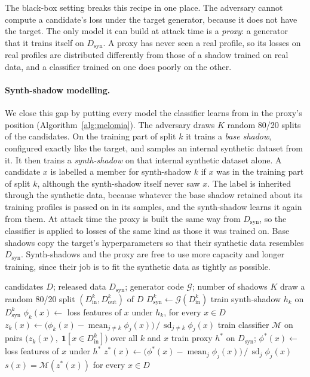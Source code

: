 \documentclass[webpdf,contemporary,large]{oup-authoring-template}
\newcommand{\Dsyn}{D_{\mathrm{syn}}}
\newcommand{\melo}{\textsc{MeLoMIA}}
\begin{document}
The black-box setting breaks this recipe in one place. The adversary cannot compute a candidate's loss under the target generator, because it does not have the target. The only model it can build at attack time is a \emph{proxy}: a generator that it trains itself on $\Dsyn$. A proxy has never seen a real profile, so its losses on real profiles are distributed differently from those of a shadow trained on real data, and a classifier trained on one does poorly on the other.

\paragraph{Synth-shadow modelling.}
We close this gap by putting every model the classifier learns from in the proxy's position (Algorithm~\ref{alg:melomia}). The adversary draws $K$ random 80/20 splits of the candidates. On the training part of split $k$ it trains a \emph{base shadow}, configured exactly like the target, and samples an internal synthetic dataset from it. It then trains a \emph{synth-shadow} on that internal synthetic dataset alone. A candidate $x$ is labelled a member for synth-shadow $k$ if $x$ was in the training part of split $k$, although the synth-shadow itself never saw $x$. The label is inherited through the synthetic data, because whatever the base shadow retained about its training profiles is passed on in its samples, and the synth-shadow learns it again from them. At attack time the proxy is built the same way from $\Dsyn$, so the classifier is applied to losses of the same kind as those it was trained on. Base shadows copy the target's hyperparameters so that their synthetic data resembles $\Dsyn$. Synth-shadows and the proxy are free to use more capacity and longer training, since their job is to fit the synthetic data as tightly as possible.

\begin{algorithm}[!t]
\caption{\melo{}}\label{alg:melomia}
\begin{algorithmic}[1]
\Require candidates $D$; released data $\Dsyn$; generator code $\mathcal{G}$; number of shadows $K$
  \State draw a random 80/20 split $(D^{k}_{\mathrm{in}}, D^{k}_{\mathrm{out}})$ of $D$
  \State $D^{k}_{\mathrm{syn}} \gets \mathcal{G}(D^{k}_{\mathrm{in}})$ 
  \State train synth-shadow $h_k$ on $D^{k}_{\mathrm{syn}}$
  \State $\phi_k(x) \gets$ loss features of $x$ under $h_k$, for every $x \in D$
\EndFor
\State $z_k(x) \gets \bigl(\phi_k(x) - \operatorname{mean}_{j \neq k}\phi_j(x)\bigr) \,/\, \operatorname{sd}_{j \neq k}\phi_j(x)$ 
\State train classifier $\mathcal{M}$ on pairs $\bigl(z_k(x),\; \mathbf{1}[x \in D^{k}_{\mathrm{in}}]\bigr)$ over all $k$ and $x$
\State train proxy $h^{\ast}$ on $\Dsyn$; \; $\phi^{\ast}(x) \gets$ loss features of $x$ under $h^{\ast}$
\State $z^{\ast}(x) \gets \bigl(\phi^{\ast}(x) - \operatorname{mean}_{j}\phi_j(x)\bigr) \,/\, \operatorname{sd}_{j}\phi_j(x)$
\State \Return $s(x) = \mathcal{M}(z^{\ast}(x))$ for every $x \in D$
\end{algorithmic}
\end{algorithm}
\end{document}
